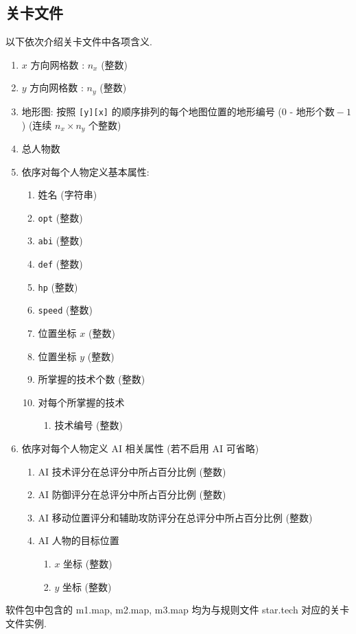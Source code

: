 \documentclass[UTF8, zihao=-4]{ctexart} %
\newcommand{\lcode}{\lstinline} % 段内插入代码
\begin{document}
\subsection{关卡文件}
以下依次介绍关卡文件中各项含义.
\begin{enumerate}
      \item $x$ 方向网格数 : $n_x$ (整数)
      \item $y$ 方向网格数 : $n_y$ (整数)
      \item 地形图: 按照 \lcode{[y][x]} 的顺序排列的每个地图位置的地形编号 ($0$ - $\text{地形个数} - 1$) (连续 $n_x \times n_y$ 个整数)
      \item 总人物数
      \item 依序对每个人物定义基本属性:
            \begin{enumerate}
                  \item 姓名 (字符串)
                  \item \lcode{opt} (整数)
                  \item \lcode{abi} (整数)
                  \item \lcode{def} (整数)
                  \item \lcode{hp} (整数) 
                  \item \lcode{speed} (整数)
                  \item 位置坐标 $x$ (整数)
                  \item 位置坐标 $y$ (整数)
                  \item 所掌握的技术个数 (整数)
                  \item 对每个所掌握的技术
                        \begin{enumerate}
                              \item 技术编号 (整数)
                        \end{enumerate}
            \end{enumerate}
      \item 依序对每个人物定义 AI 相关属性 (若不启用 AI 可省略)
            \begin{enumerate}
                  \item AI 技术评分在总评分中所占百分比例 (整数)
                  \item AI 防御评分在总评分中所占百分比例 (整数)
                  \item AI 移动位置评分和辅助攻防评分在总评分中所占百分比例 (整数)
                  \item AI 人物的目标位置 
                        \begin{enumerate}
                              \item $x$ 坐标 (整数)
                              \item $y$ 坐标 (整数)
                        \end{enumerate}
            \end{enumerate}
\end{enumerate}
软件包中包含的 m1.map, m2.map, m3.map 均为与规则文件 star.tech 对应的关卡文件实例.
\end{document}
